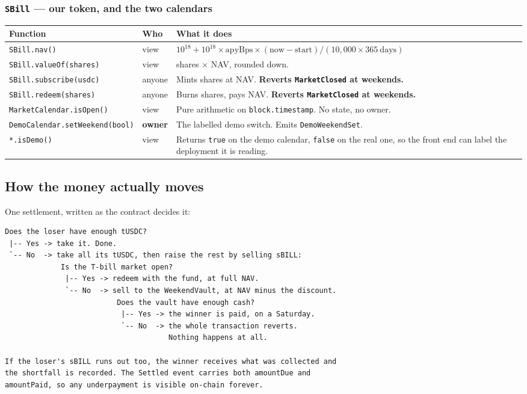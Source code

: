 \documentclass[11pt,a4paper]{article}
\begin{document}
\subsubsection*{\texttt{SBill} --- our token, and the two calendars}

\begin{center}
\footnotesize
\begin{tabular}{@{}p{4.9cm}p{1.7cm}p{8.7cm}@{}}
\toprule
\textbf{Function} & \textbf{Who} & \textbf{What it does} \\
\midrule
\texttt{SBill.nav()} & view & $10^{18} + 10^{18}\times \text{apyBps}\times(\text{now}-\text{start}) / (10{,}000\times365\ \text{days})$ \\
\texttt{SBill.valueOf(shares)} & view & shares $\times$ NAV, rounded down. \\
\texttt{SBill.subscribe(usdc)} & anyone & Mints shares at NAV. \textbf{Reverts \texttt{MarketClosed} at weekends.} \\
\texttt{SBill.redeem(shares)} & anyone & Burns shares, pays NAV. \textbf{Reverts \texttt{MarketClosed} at weekends.} \\
\texttt{MarketCalendar.isOpen()} & view & Pure arithmetic on \texttt{block.timestamp}. No state, no owner. \\
\texttt{DemoCalendar.setWeekend(bool)} & \textbf{owner} & The labelled demo switch. Emits \texttt{DemoWeekendSet}. \\
\texttt{*.isDemo()} & view & Returns \texttt{true} on the demo calendar, \texttt{false} on the real one, so the front end can label the deployment it is reading. \\
\bottomrule
\end{tabular}
\end{center}

\subsection{How the money actually moves}

One settlement, written as the contract decides it:

\begin{center}\small
\begin{verbatim}
Does the loser have enough tUSDC?
 |-- Yes -> take it. Done.
 `-- No  -> take all its tUSDC, then raise the rest by selling sBILL:
             Is the T-bill market open?
              |-- Yes -> redeem with the fund, at full NAV.
              `-- No  -> sell to the WeekendVault, at NAV minus the discount.
                          Does the vault have enough cash?
                           |-- Yes -> the winner is paid, on a Saturday.
                           `-- No  -> the whole transaction reverts.
                                      Nothing happens at all.

If the loser's sBILL runs out too, the winner receives what was collected and
the shortfall is recorded. The Settled event carries both amountDue and
amountPaid, so any underpayment is visible on-chain forever.
\end{verbatim}
\end{center}
\end{document}
